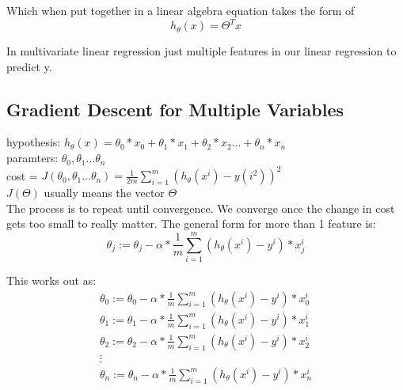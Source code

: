 Which when put together in a linear algebra equation takes the form of
\begin{equation}
  h_{\theta}(x) = \Theta^{T}x
\end{equation}

In multivariate linear regression just multiple features in our linear regression to predict y.

\subsection{Gradient Descent for Multiple Variables}

hypothesis:  $h_{\theta}(x) = \theta_{0}*x_{0} + \theta_{1} * x_{1} + \theta_{2} * x_{2} ... + \theta_{n} * x_{n}$ \\

paramters: $\theta_{0}, \theta_{1} ... \theta_{n}$ \\

cost = $J(\theta_{0}, \theta_{1} ... \theta_{n}) = \frac{1}{2m} \sum_{i=1}^{m} (h_{\theta}(x^{i}) - y(i^{2}))^{2}$ \\

$J(\Theta)$ usually means the vector $\Theta$ \\

The process is to repeat until convergence.  We converge once the change in cost gets too small to really matter.
The general form for more than 1 feature is:
\begin{equation}
  \theta_{j} := \theta_{j} - \alpha *\frac{1}{m} \sum_{i=1}^{m} (h_{\theta}(x^{i}) -y^{i})*x_{j}^{i}
\end{equation}

This works out as:
\begin{equation}
  \begin{aligned}
  \theta_{0} := \theta_{0} - \alpha *\frac{1}{m} \sum_{i=1}^{m} (h_{\theta}(x^{i}) -y^{i})*x_{0}^{i} \\
  \theta_{1} := \theta_{1} - \alpha *\frac{1}{m} \sum_{i=1}^{m} (h_{\theta}(x^{i}) -y^{i})*x_{1}^{i} \\
  \theta_{2} := \theta_{2} - \alpha *\frac{1}{m} \sum_{i=1}^{m} (h_{\theta}(x^{i}) -y^{i})*x_{2}^{i} \\  
  \vdots \\  
  \theta_{n} := \theta_{n} - \alpha *\frac{1}{m} \sum_{i=1}^{m} (h_{\theta}(x^{i}) -y^{i})*x_{n}^{i} \\
  \end{aligned} 
\end{equation}

